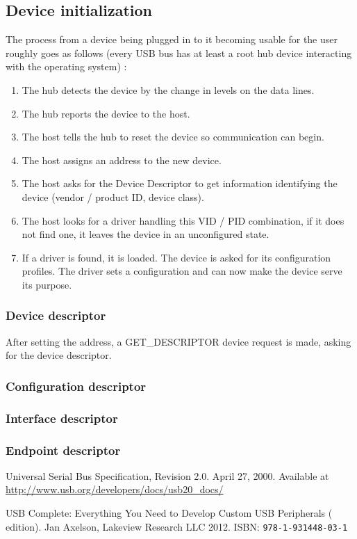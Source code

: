 \documentclass{article}
\begin{document}
\subsection{Device initialization}

The process from a device being plugged in to it becoming usable for the user
roughly goes as follows (every USB bus has at least a root hub device interacting with
the operating system) \cite[p. 87ff.]{uc}:

\begin{enumerate}
  \item The hub detects the device by the change in levels on the data lines.
  \item The hub reports the device to the host.
  \item The host tells the hub to reset the device so communication can begin.
  \item The host assigns an address to the new device.
  \item The host asks for the Device Descriptor to get information identifying the device
        (vendor / product ID, device class).
  \item The host looks for a driver handling this VID / PID combination, if it does not find one,
        it leaves the device in an unconfigured state.
  \item If a driver is found, it is loaded. The device is asked for its configuration profiles.
        The driver sets a configuration and can now make the device serve its purpose.
\end{enumerate}

\subsubsection{Device descriptor}

After setting the address, a GET\_DESCRIPTOR
device request is made, asking for the device descriptor.

\subsubsection{Configuration descriptor}

\subsubsection{Interface descriptor}

\subsubsection{Endpoint descriptor}

\begin{thebibliography}{}

Universal Serial Bus Specification, Revision 2.0. April 27, 2000. Available at \url{http://www.usb.org/developers/docs/usb20_docs/}

USB Complete: Everything You Need to Develop Custom USB Peripherals ( edition).
Jan Axelson, Lakeview Research LLC 2012. ISBN: {\tt   978-1-931448-03-1}


\end{thebibliography}
\end{document}
